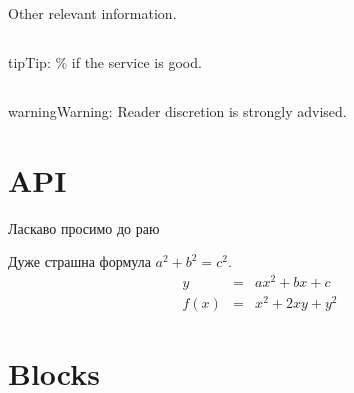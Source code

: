 \documentclass[a4paper,10pt,english]{sphinxmanual}
\begin{document}
\nopagebreak


\sphinxAtStartPar
Other relevant information.




\section{}
\label{\detokenize{test:tip}}
\begin{sphinxadmonition}{tip}{Tip:}
\% if the service is good.
\end{sphinxadmonition}


\section{}
\label{\detokenize{test:todo}}

\section{}
\label{\detokenize{test:warning}}
\begin{sphinxadmonition}{warning}{Warning:}
\sphinxAtStartPar
Reader discretion is strongly advised.
\end{sphinxadmonition}

\sphinxstepscope


\chapter{API}
\label{\detokenize{api:api}}\label{\detokenize{api::doc}}
\sphinxAtStartPar
Ласкаво просимо до раю
\begin{center}\end{center}
\sphinxAtStartPar
Дуже страшна формула \(a^2 + b^2 = c^2\).
\begin{eqnarray}
   y    & = & ax^2 + bx + c \\
   f(x) & = & x^2 + 2xy + y^2
\end{eqnarray}
\sphinxstepscope


\chapter{Blocks}
\label{\detokenize{test1:blocks}}\label{\detokenize{test1::doc}}
\end{document}
